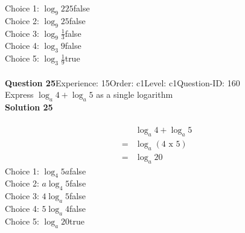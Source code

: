 \documentclass{article}
\begin{document}
Choice 1: \hspace{20pt}$\log_{9}225$\hspace{20pt}false\\
Choice 2: \hspace{20pt}$\log_{9}25$\hspace{20pt}false\\
Choice 3: \hspace{20pt}$\log_{9}\displaystyle\frac{1}{3}$\hspace{20pt}false\\
Choice 4: \hspace{20pt}$\log_{3}9$\hspace{20pt}false\\
Choice 5: \hspace{20pt}$\log_{3}\displaystyle\frac{1}{9}$\hspace{20pt}true\\
\\[4pt]
\noindent\textbf{Question 25}\hspace{20pt}Experience: 15\hspace{20pt}Order: c1\hspace{20pt}Level: c1\hspace{20pt}Question-ID: 160\\[2pt]
Express $\log_{a}4+\log_{a}5$ as a single logarithm\\[4pt]
\noindent\textbf{Solution 25}\\[2pt]
\\[-35pt]\begin{align*}
&\log_{a}4+\log_{a}5\\[2pt]
=&\log_{a}(4 \,\, \text{x} \,\, 5)\\[2pt]
=&\log_{a}20
\end{align*}
Choice 1: \hspace{20pt}$\log_{4}5a$\hspace{20pt}false\\
Choice 2: \hspace{20pt}$a\log_{4}5$\hspace{20pt}false\\
Choice 3: \hspace{20pt}$4\log_{a}5$\hspace{20pt}false\\
Choice 4: \hspace{20pt}$5\log_{a}4$\hspace{20pt}false\\
Choice 5: \hspace{20pt}$\log_{a}20$\hspace{20pt}true\\
\end{document}
